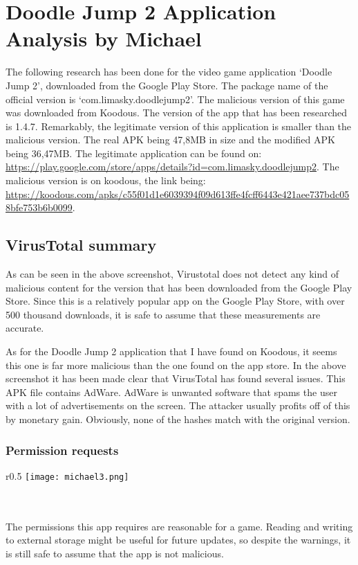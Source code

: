 \section{Doodle Jump 2 Application Analysis by Michael}

The following research has been done for the video game application ‘Doodle Jump 2’, downloaded from the Google Play Store. The package name of the official version is ‘com.limasky.doodlejump2’. The malicious version of this game was downloaded from Koodous. The version of the app that has been researched is 1.4.7. Remarkably, the legitimate version of this application is smaller than the malicious version. The real APK being 47,8MB in size and the modified APK being 36,47MB. The legitimate application can be found on: \url{https://play.google.com/store/apps/details?id=com.limasky.doodlejump2}. The malicious version is on koodous, the link being: \url{https://koodous.com/apks/c55f01d1e6039394f09d613ffe4fcff6443e421aee737bdc058bfe753b6b0099}.
\subsection{VirusTotal summary}


\noindent{}

As can be seen in the above screenshot, Virustotal does not detect any kind of malicious content for the version that has been downloaded from the Google Play Store. Since this is a relatively popular app on the Google Play Store, with over 500 thousand downloads, it is safe to assume that these measurements are accurate.

\noindent{}

As for the Doodle Jump 2 application that I have found on Koodous, it seems this one is far more malicious than the one found on the app store. In the above screenshot it has been made clear that VirusTotal has found several issues. This APK file contains AdWare. AdWare is unwanted software that spams the user with a lot of advertisements on the screen. The attacker usually profits off of this by monetary gain. Obviously, none of the hashes match with the original version.
\subsubsection{Permission requests}

\begin{minipage}{\linewidth}
\begin{wrapfigure}{r}{0.5\textwidth}
\centering
\texttt{[image: michael3.png]}
\end{wrapfigure}

~\\
~\\
The permissions this app requires are reasonable for a game. Reading and writing to external storage might be useful for future updates, so despite the warnings, it is still safe to assume that the app is not malicious.
\end{minipage}

